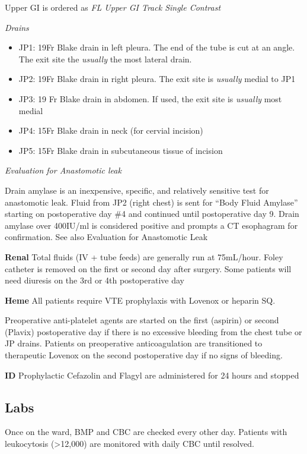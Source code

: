 \documentclass[
]{book}
\providecommand{\tightlist}{%
  \setlength{\itemsep}{0pt}\setlength{\parskip}{0pt}}
\begin{document}
Upper GI is ordered as \emph{FL Upper GI Track Single Contrast}

\emph{Drains}

\begin{itemize}
\tightlist
\item
  JP1: 19Fr Blake drain in left pleura. The end of the tube is cut at an angle. The exit site the \emph{usually} the most lateral drain.
\item
  JP2: 19Fr Blake drain in right pleura. The exit site is \emph{usually} medial to JP1
\item
  JP3: 19 Fr Blake drain in abdomen. If used, the exit site is \emph{usually} most medial
\item
  JP4: 15Fr Blake drain in neck (for cervial incision)
\item
  JP5: 15Fr Blake drain in subcutaneous tissue of incision
\end{itemize}

\emph{Evaluation for Anastomotic leak}

Drain amylase is an inexpensive, specific, and relatively sensitive test for anastomotic leak. Fluid from JP2 (right chest) is sent for ``Body Fluid Amylase'' starting on postoperative day \#4 and continued until postoperative day 9. Drain amylase over 400IU/ml is considered positive and prompts a CT esophagram for confirmation. See also Evaluation for Anastomotic Leak

\textbf{Renal}
Total fluids (IV + tube feeds) are generally run at 75mL/hour. Foley catheter is removed on the first or second day after surgery. Some patients will need diuresis on the 3rd or 4th postoperative day

\textbf{Heme}
All patients require VTE prophylaxis with Lovenox or heparin SQ.

Preoperative anti-platelet agents are started on the first (aspirin) or second (Plavix) postoperative day if there is no excessive bleeding from the chest tube or JP drains. Patients on preoperative anticoagulation are transitioned to therapeutic Lovenox on the second postoperative day if no signs of bleeding.

\textbf{ID}
Prophylactic Cefazolin and Flagyl are administered for 24 hours and stopped

\hypertarget{labs}{%
\subsection{Labs}\label{labs}}

Once on the ward, BMP and CBC are checked every other day. Patients with leukocytosis (\textgreater12,000) are monitored with daily CBC until resolved.
\end{document}
